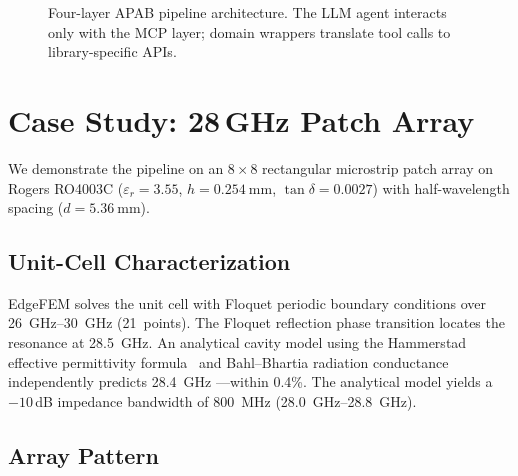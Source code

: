 \documentclass[journal]{IEEEtran}
\begin{document}
\begin{figure}[!t]
\centering
{}
\caption{Four-layer APAB pipeline architecture. The LLM agent
interacts only with the MCP layer; domain wrappers translate tool
calls to library-specific APIs.}
\label{fig:arch}
\end{figure}

\section{Case Study: 28\,GHz Patch Array}

We demonstrate the pipeline on an $8\times8$ rectangular microstrip
patch array on Rogers RO4003C ($\varepsilon_r = 3.55$,
$h = \SI{0.254}{\milli\meter}$, $\tan\delta = 0.0027$) with
half-wavelength spacing ($d = \SI{5.36}{\milli\meter}$).

\subsection{Unit-Cell Characterization}

EdgeFEM solves the unit cell with Floquet periodic boundary conditions
over \SIrange{26}{30}{\giga\hertz} (21~points). The Floquet reflection
phase transition locates the resonance at \SI{28.5}{\giga\hertz}.
An analytical cavity model using the Hammerstad effective permittivity
formula~\cite{hammerstad1975} and Bahl--Bhartia radiation
conductance~\cite{bahl1980} independently predicts \SI{28.4}{\giga\hertz}
---within 0.4\%. The analytical model yields a $-10$\,dB impedance
bandwidth of \SI{800}{\mega\hertz} (\SIrange{28.0}{28.8}{\giga\hertz}).

\subsection{Array Pattern}
\end{document}
